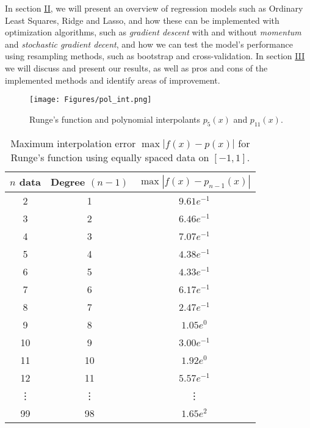 \documentclass[amssymb,twocolumn,aps]{revtex4}
\begin{document}
In section \hyperref[section:methods]{II}, we will present an overview of regression models such as Ordinary Least Squares, Ridge and Lasso, and how these can be implemented with optimization algorithms, such as \textit{gradient descent} with and without \textit{momentum} and \textit{stochastic gradient decent}, and how we can test the model's performance using resampling methods, such as bootstrap and cross-validation.
In section \hyperref[section:results]{III}  we will discuss and present our results, as well as pros and cons of the implemented methods and identify areas of improvement.

\begin{figure}[h]
    \centering
    \texttt{[image: Figures/pol\_int.png]}
    \caption{Runge's function and polynomial interpolants $p_5(x)$ and $p_{11}(x)$.}
    \label{fig:rungesfunction}
\end{figure}

\begin{table}
    \centering
    \begin{tabular}{c | c | c}
        $n$ data & Degree $(n-1)$ & $\max|f(x) - p_{n-1}(x)|$ \\
        \hline
        2        & 1              & $9.61e^{-1}$              \\
        3        & 2              & $6.46e^{-1}$              \\
        4        & 3              & $7.07e^{-1}$              \\
        5        & 4              & $4.38e^{-1}$              \\
        6        & 5              & $4.33e^{-1}$              \\
        7        & 6              & $6.17e^{-1}$              \\
        8        & 7              & $2.47e^{-1}$              \\
        9        & 8              & $1.05e^{0}$               \\
        10       & 9              & $3.00e^{-1}$              \\
        11       & 10             & $1.92e^{0}$               \\
        12       & 11             & $5.57e^{-1}$              \\
        \vdots   & \vdots         & \vdots                    \\
        99       & 98             & $1.65e^{2}$               \\
        \bottomrule
    \end{tabular}
    \caption{Maximum interpolation error $\max |f(x) - p(x)|$ for Runge's function using equally spaced data on $[-1,1]$.}
    \label{tab:runge_error}
\end{table}
\end{document}
